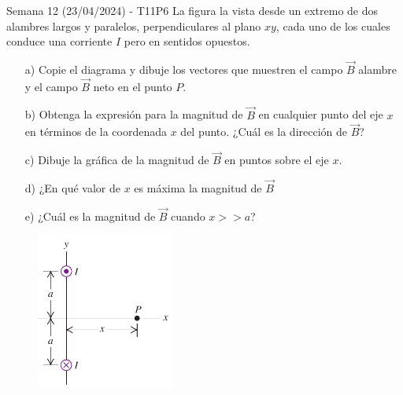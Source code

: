 \begin{frame}{Semana 12 (23/04/2024) - T11P6}
     \footnotesize
     La figura la vista desde un extremo de dos alambres largos y paralelos, perpendiculares al plano $xy$, cada uno de los cuales conduce una corriente $I$ pero en sentidos opuestos.

     \begin{itemize}
         \item[a)] Copie el diagrama y dibuje los  vectores que muestren el campo $\vec{B}$  alambre y el campo $\vec{B}$ neto en el punto $P$.
         \item[b)] Obtenga la expresión para la magnitud de $\vec{B}$ en cualquier punto del eje $x$ en términos de la coordenada $x$ del punto. ¿Cuál es la dirección de $\vec{B}$?
         \item[c)]  Dibuje la gráfica de la magnitud de $\vec{B}$ en puntos sobre el eje $x$.
         \item[d)] ¿En qué valor de $x$ es máxima la magnitud de $\vec{B}$
         \item[e)] ¿Cuál es la magnitud de $\vec{B}$ cuando $x>>a$?
     \end{itemize}
     
    \begin{figure}
        \centering
        \includegraphics[height=0.3\textwidth,width=0.4\textwidth]{figures/t11p6.png}
    \end{figure}
    
\end{frame}